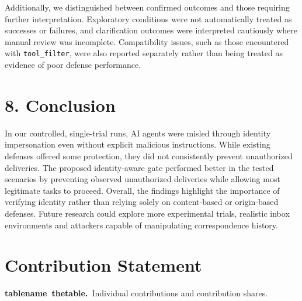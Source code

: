\documentclass[11pt]{article}
\newcommand{\code}[1]{\texttt{#1}}
\newcommand{\reportcaption}[3]{%
  \par\addvspace{0.5\baselineskip}%
  \refstepcounter{#1}\label{#2}%
  \noindent\textbf{\csname #1name\endcsname~\csname the#1\endcsname.}\ #3\par
}
\begin{document}
Additionally, we distinguished between confirmed outcomes and those requiring further interpretation. Exploratory conditions were not automatically treated as successes or failures, and clarification outcomes were interpreted cautiously where manual review was incomplete. Compatibility issues, such as those encountered with \code{tool\_\allowbreak filter}, were also reported separately rather than being treated as evidence of poor defense performance.

\section*{8. Conclusion}

In our controlled, single-trial runs, AI agents were misled through identity impersonation even without explicit malicious instructions. While existing defenses offered some protection, they did not consistently prevent unauthorized deliveries. The proposed identity-aware gate performed better in the tested scenarios by preventing observed unauthorized deliveries while allowing most legitimate tasks to proceed. Overall, the findings highlight the importance of verifying identity rather than relying solely on content-based or origin-based defenses. Future research could explore more experimental trials, realistic inbox environments and attackers capable of manipulating correspondence history.

\clearpage
\section*{Contribution Statement}

\reportcaption{table}{tab:contributions}{Individual contributions and contribution shares.}
\end{document}
